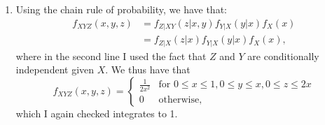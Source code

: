 \begin{problem}{14}
\begin{enumerate}
\item Using the chain rule of probability, we have that:
\begin{align*}
f_{XYZ}(x, y, z) &= f_{Z|XY}(z|x, y)f_{Y|X}(y|x)f_X(x) \\
& =f_{Z|X}(z|x)f_{Y|X}(y|x)f_X(x),
\end{align*}
where in the second line I used the fact that $Z$ and $Y$ are conditionally independent given $X$.  We thus have that 
\[
  f_{XYZ}(x, y, z) =
  \begin{cases}
                                   \frac{1}{2x^2} & \text{for $0\le x \le 1 $}, 0\le y \le x, 0\le z \le 2x \\
                                   0 & \text{otherwise},
  \end{cases}
\]
which I again checked integrates to 1. 
\end{enumerate}

\end{problem}



